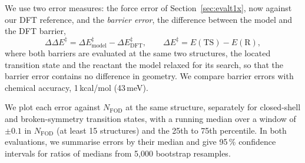 We use two error measures: the force error of Section~\ref{sec:evalt1x}, now against our DFT reference, and the \emph{barrier error}, the difference between the model and the DFT barrier,
\begin{equation}
  \Delta\Delta E^\ddagger = \Delta E^\ddagger_\mathrm{model} - \Delta E^\ddagger_\mathrm{DFT}, \qquad \Delta E^\ddagger = E(\mathrm{TS}) - E(\mathrm{R}),
\end{equation}
where both barriers are evaluated at the same two structures, the located transition state and the reactant the model relaxed for its search, so that the barrier error contains no difference in geometry. We compare barrier errors with chemical accuracy, 1\,kcal/mol (43\,meV).

We plot each error against $N_\mathrm{FOD}$ at the same structure, separately for closed-shell and broken-symmetry transition states, with a running median over a window of $\pm 0.1$ in $N_\mathrm{FOD}$ (at least 15 structures) and the 25th to 75th percentile. In both evaluations, we summarise errors by their median and give 95\,\% confidence intervals for ratios of medians from 5{,}000 bootstrap resamples.
